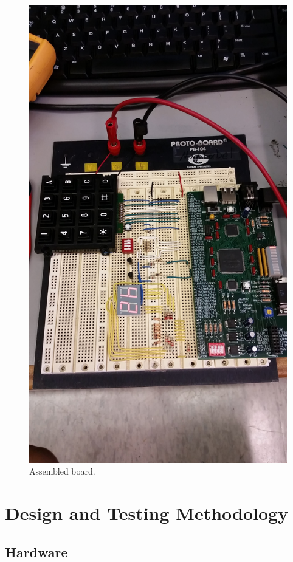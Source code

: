 \documentclass[11pt]{article}
\begin{document}
\begin{figure}[h!]
\centering
\includegraphics[scale=0.11]{board.jpg}
\caption{Assembled board.}
\label{fig:board}
\end{figure} 


\section{Design and Testing Methodology}


\subsection{Hardware}
\end{document}

